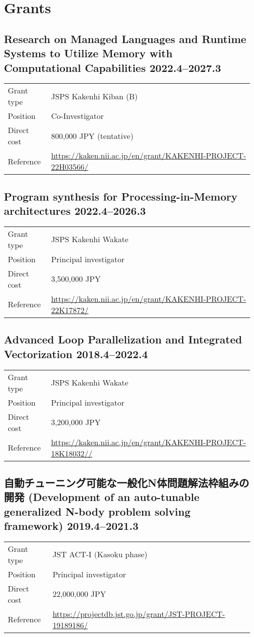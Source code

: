 \documentclass[a4paper,dvipdfmx]{article}
\newcommand{\datedsubsection}[2]{%
  \subsection[#1]{#1 \hfill #2}%
}
\begin{document}
\section{Grants}

\datedsubsection{Research on Managed Languages and Runtime Systems to
Utilize Memory with Computational Capabilities}{2022.4--2027.3}
\begin{flushleft}
\begin{tabular}[t]{lp{12cm}}
Grant type & JSPS Kakenhi Kiban (B) \\
Position & Co-Investigator \\
Direct cost & 800,000 JPY (tentative) \\
Reference & \url{https://kaken.nii.ac.jp/en/grant/KAKENHI-PROJECT-22H03566/} \\
\end{tabular}
\end{flushleft}

\datedsubsection{Program synthesis for Processing-in-Memory architectures}{2022.4--2026.3}
\begin{flushleft}
\begin{tabular}[t]{ll}
Grant type & JSPS Kakenhi Wakate \\
Position & Principal investigator \\
Direct cost & 3,500,000 JPY \\
Reference & \url{https://kaken.nii.ac.jp/en/grant/KAKENHI-PROJECT-22K17872/} \\
\end{tabular}
\end{flushleft}

\datedsubsection{Advanced Loop Parallelization and Integrated Vectorization}{2018.4--2022.4}
\begin{flushleft}
\begin{tabular}[t]{ll}
Grant type & JSPS Kakenhi Wakate \\
Position  & Principal investigator \\
Direct cost & 3,200,000 JPY \\
Reference & \url{https://kaken.nii.ac.jp/en/grant/KAKENHI-PROJECT-18K18032//} \\
\end{tabular}
\end{flushleft}

\datedsubsection{自動チューニング可能な一般化N体問題解法枠組みの開発
(Development of an auto-tunable generalized N-body problem solving framework)}{2019.4--2021.3}
\begin{flushleft}
\begin{tabular}[t]{ll}
Grant type & JST ACT-I (Kasoku phase)\\
Position  & Principal investigator \\
Direct cost & 22,000,000 JPY \\
Reference & \url{https://projectdb.jst.go.jp/grant/JST-PROJECT-19189186/} \\
\end{tabular}
\end{flushleft}
\end{document}
